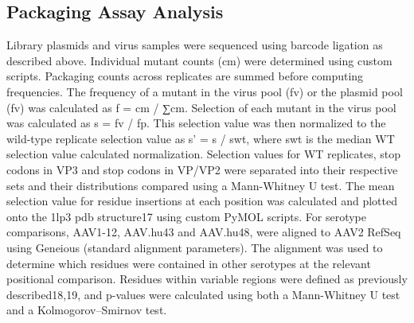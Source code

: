 \subsection{Packaging Assay Analysis}
Library plasmids and virus samples were sequenced using barcode ligation as described above. Individual mutant counts (cm) were determined using custom scripts. Packaging counts across replicates are summed before computing frequencies. The frequency of a mutant in the virus pool (fv) or the plasmid pool (fv)  was calculated as f = cm / ∑cm. Selection of each mutant in the virus pool was calculated as s = fv / fp. This selection value was then normalized to the wild-type replicate selection value  as s’ = s / swt, where swt  is the median WT selection value calculated normalization. Selection values for WT replicates, stop codons in VP3 and stop codons in VP/VP2 were separated into their respective sets and their distributions compared using a Mann-Whitney U test. The mean selection value for residue insertions at each position was calculated and plotted onto the 1lp3 pdb structure17 using custom PyMOL scripts. For serotype comparisons, AAV1-12, AAV.hu43 and AAV.hu48, were aligned to AAV2 RefSeq using Geneious (standard alignment parameters). The alignment was used to determine which residues were contained in other serotypes at the relevant positional comparison. Residues within variable regions were defined as previously described18,19, and p-values were calculated using both a Mann-Whitney U test and a Kolmogorov–Smirnov test.

